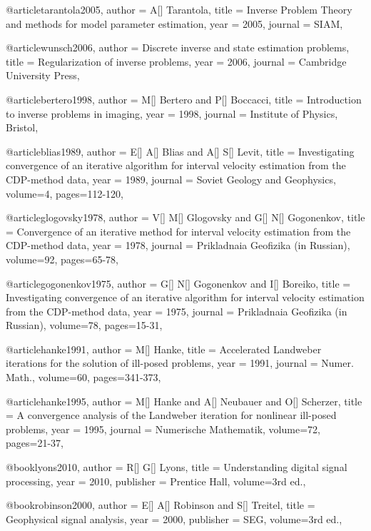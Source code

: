 @article{tarantola2005,
  author =	 {A[] Tarantola},
  title =	 {Inverse Problem Theory and methods for model parameter estimation},
  year =	 2005,
  journal =	 {SIAM},
}

@article{wunsch2006,
  author =	 {Discrete inverse and state estimation problems},
  title =	 {Regularization of inverse problems},
  year =	 2006,
  journal =	 {Cambridge University Press},
}


@article{bertero1998,
  author =	 {M[] Bertero and P[] Boccacci},
  title =	 {Introduction to inverse problems in imaging},
  year =	 1998,
  journal =	 {Institute of Physics, Bristol},
}

@article{blias1989,
  author =	 {E[] A[] Blias and A[] S[] Levit},
  title =	 {Investigating convergence of an iterative algorithm for interval velocity estimation from the CDP-method data},
  year =	 1989,
  journal =	 {Soviet Geology and Geophysics},
  volume={4},
 pages=112-120,
}


@article{glogovsky1978,
  author =	 {V[] M[] Glogovsky and G[] N[] Gogonenkov},
  title =	 {Convergence of an iterative method for interval velocity estimation from the CDP-method data},
  year =	 1978,
  journal =	 {Prikladnaia Geofizika (in Russian)},
  volume={92},
 pages=65-78,
}


@article{gogonenkov1975,
  author =	 {G[] N[] Gogonenkov and I[] Boreiko},
  title =	 {Investigating convergence of an iterative algorithm for interval velocity estimation from the CDP-method data},
  year =	 1975,
  journal =	 {Prikladnaia Geofizika (in Russian)},
  volume={78},
 pages=15-31,
}


@article{hanke1991,
  author =	 {M[] Hanke},
  title =	 {Accelerated Landweber iterations for the solution of ill-posed problems},
  year =	 1991,
  journal =	 {Numer. Math.},
  volume={60},
 pages=341-373,
}


@article{hanke1995,
  author =	 {M[] Hanke and A[] Neubauer and O[] Scherzer},
  title =	 {A convergence analysis of the Landweber iteration for nonlinear ill-posed problems},
  year =	 1995,
  journal =	 {Numerische Mathematik},
  volume={72},
 pages=21-37,
}

@book{lyons2010,
  author =	 {R[] G[] Lyons},
  title =	 {Understanding digital signal processing},
  year =	 2010,
  publisher =	 {Prentice Hall},
  volume={3rd ed.},
}

@book{robinson2000,
  author =	 {E[] A[] Robinson and S[] Treitel},
  title =	 {Geophysical signal analysis},
  year =	 2000,
  publisher =	 {SEG},
  volume={3rd ed.},
}

